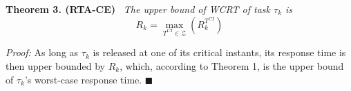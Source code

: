 \textbf{Theorem 3. (RTA-CE)} \ \textit{The upper bound of WCRT of task $\tau_k$ is}
\[
R_k=\max_{T^{CI}\in\mathcal{Z}}\left(R_k^{T^{CI}}\right)
\tag{18}
\]

\textit{Proof:} As long as $\tau_k$ is released at one of its critical instants, its response time is then upper bounded by $R_k$, which, according to Theorem 1, is the upper bound of $\tau_k$'s worst-case response time. \hfill $\blacksquare$